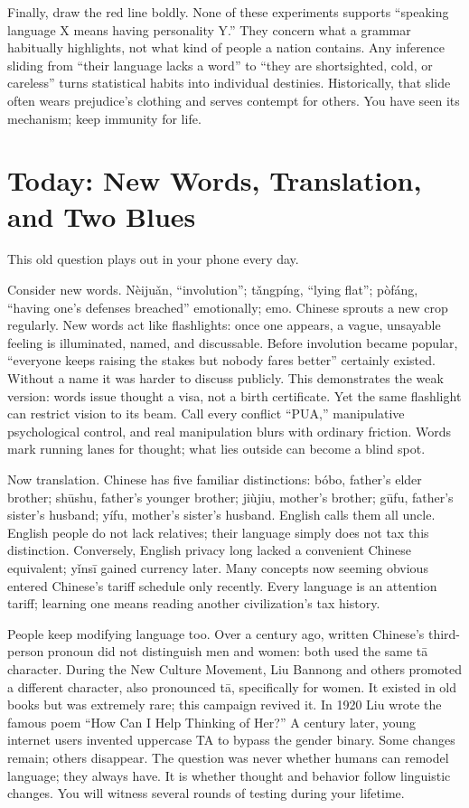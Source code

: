 Finally, draw the red line boldly. None of these experiments supports ``speaking language X means having personality Y.'' They concern what a grammar habitually highlights, not what kind of people a nation contains. Any inference sliding from ``their language lacks a word'' to ``they are shortsighted, cold, or careless'' turns statistical habits into individual destinies. Historically, that slide often wears prejudice's clothing and serves contempt for others. You have seen its mechanism; keep immunity for life.

\section[Today: New Words and Two Blues]{Today: New Words, Translation, and Two Blues}
This old question plays out in your phone every day.

Consider new words. Nèijuǎn, ``involution''; tǎngpíng, ``lying flat''; pòfáng, ``having one's defenses breached'' emotionally; emo. Chinese sprouts a new crop regularly. New words act like flashlights: once one appears, a vague, unsayable feeling is illuminated, named, and discussable. Before involution became popular, ``everyone keeps raising the stakes but nobody fares better'' certainly existed. Without a name it was harder to discuss publicly. This demonstrates the weak version: words issue thought a visa, not a birth certificate. Yet the same flashlight can restrict vision to its beam. Call every conflict ``PUA,'' manipulative psychological control, and real manipulation blurs with ordinary friction. Words mark running lanes for thought; what lies outside can become a blind spot.

Now translation. Chinese has five familiar distinctions: bóbo, father's elder brother; shūshu, father's younger brother; jiùjiu, mother's brother; gūfu, father's sister's husband; yífu, mother's sister's husband. English calls them all uncle. English people do not lack relatives; their language simply does not tax this distinction. Conversely, English privacy long lacked a convenient Chinese equivalent; yǐnsī gained currency later. Many concepts now seeming obvious entered Chinese's tariff schedule only recently. Every language is an attention tariff; learning one means reading another civilization's tax history.

People keep modifying language too. Over a century ago, written Chinese's third-person pronoun did not distinguish men and women: both used the same tā character. During the New Culture Movement, Liu Bannong and others promoted a different character, also pronounced tā, specifically for women. It existed in old books but was extremely rare; this campaign revived it. In 1920 Liu wrote the famous poem ``How Can I Help Thinking of Her?'' A century later, young internet users invented uppercase TA to bypass the gender binary. Some changes remain; others disappear. The question was never whether humans can remodel language; they always have. It is whether thought and behavior follow linguistic changes. You will witness several rounds of testing during your lifetime.

